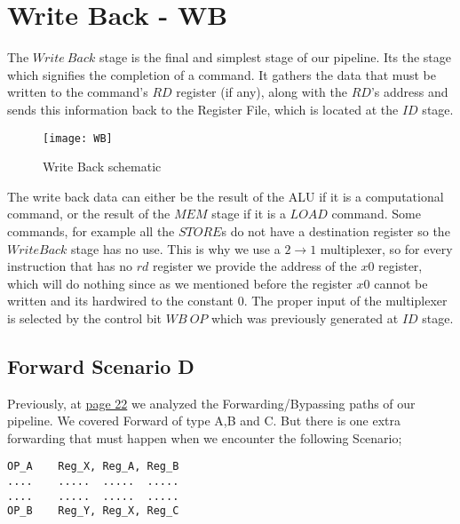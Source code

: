 \clearpage

\section{Write Back - WB}
\label{Sec3.5:WB}

The $Write \ Back$ stage is the final and simplest stage of our pipeline. Its the stage which signifies the completion of a command. It gathers the data that must be written to the command's $RD$ register (if any), along with the $RD$'s address and sends this information back to the Register File, which is located at the $ID$ stage.

\begin{figure}[h!]
	\begin{center}
		\texttt{[image: WB]}
		\caption{Write Back schematic}
		\label{Image3.13}
	\end{center}
\end{figure}

\vspace {-3mm}

The write back data can either be the result of the ALU if it is a computational command, or the result of the $MEM$ stage if it is a $LOAD$ command. Some commands, for example all the $STORE$s do not have a destination register so the $Write Back$ stage has no use. This is why we use a $2\rightarrow 1$ multiplexer, so for every instruction that has no $rd$ register we provide the address of the $x0$ register, which will do nothing since as we mentioned before the register $x0$ cannot be written and its hardwired to the constant $0$. The proper input of the multiplexer is selected by the control bit $WB\ OP$ which was previously generated at $ID$ stage.

\subsection{Forward Scenario D}
\label{SubSec3.5.1:FWDD}

Previously, at \hyperlink{page.22}{page 22} we analyzed the Forwarding/Bypassing paths of our pipeline. We covered Forward of type A,B and C. But there is one extra forwarding that must happen when we encounter the following Scenario;

\begin{lstlisting}[caption={Forward Path D Example},captionpos=b]
OP_A	Reg_X, Reg_A, Reg_B
....	.....  .....  .....
....	.....  .....  .....
OP_B 	Reg_Y, Reg_X, Reg_C
\end{lstlisting}

